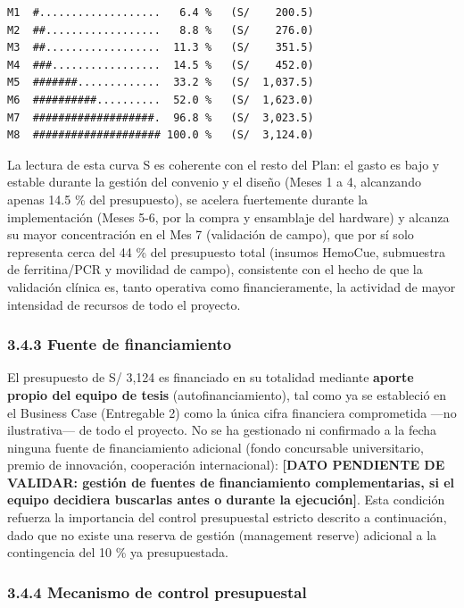 \documentclass[11pt,a4paper]{article}
\begin{document}
\begin{samepage}\begin{verbatim}
M1  #...................   6.4 %   (S/    200.5)
M2  ##..................   8.8 %   (S/    276.0)
M3  ##..................  11.3 %   (S/    351.5)
M4  ###.................  14.5 %   (S/    452.0)
M5  #######.............  33.2 %   (S/  1,037.5)
M6  ##########..........  52.0 %   (S/  1,623.0)
M7  ###################.  96.8 %   (S/  3,023.5)
M8  #################### 100.0 %   (S/  3,124.0)
\end{verbatim}\end{samepage}

La lectura de esta curva S es coherente con el resto del Plan: el gasto es bajo y estable durante la gestión del convenio y el diseño (Meses 1 a 4, alcanzando apenas 14.5 \% del presupuesto), se acelera fuertemente durante la implementación (Meses 5-6, por la compra y ensamblaje del hardware) y alcanza su mayor concentración en el Mes 7 (validación de campo), que por sí solo representa cerca del 44 \% del presupuesto total (insumos HemoCue, submuestra de ferritina/PCR y movilidad de campo), consistente con el hecho de que la validación clínica es, tanto operativa como financieramente, la actividad de mayor intensidad de recursos de todo el proyecto.

\subsubsection{3.4.3 Fuente de financiamiento}\label{fuente-de-financiamiento}

El presupuesto de S/ 3,124 es financiado en su totalidad mediante \textbf{aporte propio del equipo de tesis} (autofinanciamiento), tal como ya se estableció en el Business Case (Entregable 2) como la única cifra financiera comprometida ---no ilustrativa--- de todo el proyecto. No se ha gestionado ni confirmado a la fecha ninguna fuente de financiamiento adicional (fondo concursable universitario, premio de innovación, cooperación internacional): \textbf{{[}DATO PENDIENTE DE VALIDAR: gestión de fuentes de financiamiento complementarias, si el equipo decidiera buscarlas antes o durante la ejecución{]}}. Esta condición refuerza la importancia del control presupuestal estricto descrito a continuación, dado que no existe una reserva de gestión (management reserve) adicional a la contingencia del 10 \% ya presupuestada.

\subsubsection{3.4.4 Mecanismo de control presupuestal}\label{mecanismo-de-control-presupuestal}
\end{document}
